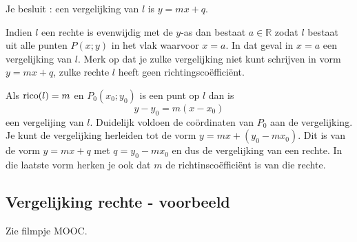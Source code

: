 Je besluit : een vergelijking van $l$ is $y=mx+q$.

Indien $l$ een rechte is evenwijdig met de $y$-as dan bestaat $a \in \mathbb{R}$ zodat $l$ bestaat uit alle punten $P(x;y)$ in het vlak waarvoor $x=a$.
In dat geval in $x=a$ een vergelijking van $l$.
Merk op dat je zulke vergelijking niet kunt schrijven in vorm $y=mx+q$, zulke rechte $l$ heeft geen richtingsco\"effici\"ent.

\begin{opmerking}
	Als $\operatorname{rico}(l)=m$ en $P_0(x_0;y_0)$ is een punt op $l$ dan is
\[
y-y_0=m(x-x_0)
\]
een vergelijing van $l$.
Duidelijk voldoen de co\"ordinaten van $P_0$ aan de vergelijking.
Je kunt de vergelijking herleiden tot de vorm $y=mx+(y_0-mx_0)$.
Dit is van de vorm $y=mx+q$ met $q=y_0-mx_0$ en dus de vergelijking van een rechte.
In die laatste vorm herken je ook dat $m$ de richtinsco\"effici\"ent is van die rechte.\\
\end{opmerking}

%
%
%
%
%


\subsection{Vergelijking rechte - voorbeeld}
Zie filmpje MOOC.

